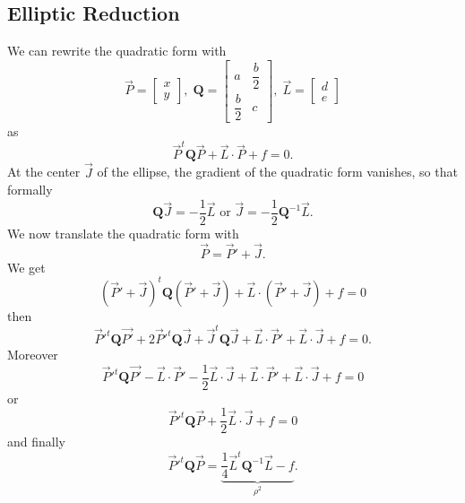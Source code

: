 \documentclass[aps]{revtex4}
\begin{document}
\subsection{Elliptic Reduction}
We can rewrite the quadratic form with
\begin{equation}
	\vec{P} = \begin{bmatrix}
		x\\
		y
		\end{bmatrix},
		\;
		\bm{Q} = \begin{bmatrix}
		a & \dfrac{b}{2}\\
		\dfrac{b}{2} & c
		\end{bmatrix},\;
		\vec{L} = \begin{bmatrix}
		d\\
		e
		\end{bmatrix}
\end{equation}
as
\begin{equation}
	\vec{P}^t \bm{Q} \vec{P} + \vec{L}\cdot\vec{P} + f = 0.
\end{equation}
At the center $\vec{J}$ of the ellipse, the gradient of the quadratic form 
vanishes, so that formally
\begin{equation}
	\bm{Q}\vec{J} = -\dfrac{1}{2}\vec{L}\text{ or }\vec{J} = -\dfrac{1}{2} \bm{Q}^{-1} \vec{L}.
\end{equation}
We now translate the quadratic form with
\begin{equation}
	\vec{P} = \vec{P}' + \vec{J}.
\end{equation}
We get
\begin{equation}
	\left(\vec{P}' + \vec{J}\right)^t \bm{Q} \left(\vec{P}' + \vec{J}\right) +
	\vec{L}\cdot\left(\vec{P}' + \vec{J}\right) + f = 0
\end{equation}
then
\begin{equation}
	\vec{P}'^t \bm{Q} \vec{P'} + 2 \vec{P}'^t \bm{Q} \vec{J} + \vec{J}^t \bm{Q} \vec{J} + 
	\vec{L}\cdot\vec{P}' + \vec{L}\cdot\vec{J} + f = 0.
\end{equation}
Moreover
\begin{equation}
	\vec{P}'^t \bm{Q} \vec{P'} - \vec{L}\cdot\vec{P}' - \dfrac{1}{2} \vec{L}\cdot\vec{J} +
    \vec{L}\cdot\vec{P}' + \vec{L}\cdot\vec{J} + f = 0
\end{equation}
or
\begin{equation}
	\vec{P}'^t \bm{Q} \vec{P} + \dfrac{1}{2} \vec{L}\cdot\vec{J} + f = 0
\end{equation}
and finally
\begin{equation}
	\vec{P}'^t \bm{Q} \vec{P} = \underbrace{\dfrac{1}{4} \vec{L}^t \bm{Q}^{-1} \vec{L} -f}_{\rho^2}.
\end{equation}
\end{document}
